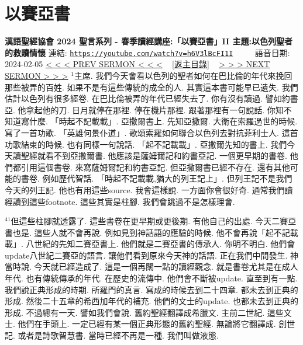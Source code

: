 \documentclass{book}
\begin{document}
\section{以賽亞書}
\label{sec:h6V3lBcFI1I}
\textbf{漢語聖經協會 2024 聖言系列 - 春季讀經講座:「以賽亞書」II 主題:以色列聖者的救贖情懷}
\newline
\newline
連結: \href{https://youtube.com/watch?v=h6V3lBcFI1I}{\texttt{https://youtube.com/watch?v=h6V3lBcFI1I}} ~~~~ 語音日期: 2024-02-05
\newline
\newline
\hyperref[sec:SrQmAQLb4ew]{\small{< < < PREV SERMON < < <}}
~
\hyperref[sec:index]{\small{[返主目錄]}}
~
\hyperref[sec:lB_bfqbs0xw]{\small{> > > NEXT SERMON > > >}}
\newline
\newline
$^{1}$主席.
我們今天會看以色列的聖者如何在巴比倫的年代來挽回那些被弄的百姓.
如果不是有這些傳統的成全的人.
其實這本書可能早已遺失.
我們估計以色列有很多經卷.
在巴比倫被弄的年代已經失去了.
你有沒有讀過.
譬如約書亞.
他拿起他的刀.
日月就停在那裡.
停在機片那裡.
跟著那裡有一句說話.
你知不知道寫什麼.
「時起不記載載」.
亞撒爾書上.
先知亞撒爾.
大衛在索羅過世的時候.
寫了一首功歌.
「英雄何景仆道」.
歌頌索羅如何聯合以色列去對抗菲利士人.
這首功歌結束的時候.
也有同樣一句說話.
「起不記載載」.
亞撒爾先知的書上.
我們今天讀聖經就看不到亞撒爾書.
他應該是薩姆爾記和約書亞記.
一個更早期的書卷.
他們都引用這個書卷.
來寫薩姆爾記和約書亞記.
但亞撒爾書已經不存在.
還有其他可能的書卷.
例如歷代智話.
「時起不記載載,猶大的列王記上」.
但列王記不是我們今天的列王記.
他也有用這些source.
我會這樣說.
一方面你會很好奇.
通常我們讀經讀到這些footnote.
這些其實是柱腳.
我們會跳過不是怎樣理會.

$^{41}$但這些柱腳就透露了.
這些書卷在更早期或更後期.
有他自己的出處.
今天二賽亞書也是.
這些人就不會再說.
例如見到神話語的應驗的時候.
他不會再說「起不記載載」.
八世紀的先知二賽亞書上.
他們就是二賽亞書的傳承人.
你明不明白.
他們會update八世紀二賽亞的語言.
讓他們看到原來今天神的話語.
正在我們中間發生.
神當時說.
今天就已經造成了.
這是一個再闊一點的讀經觀念.
就是書卷尤其是在成人年代.
也有傳統傳承的年代.
在歷史的流傳中.
他們會不斷被update.
直至到有一點.
我們說正典形成的時期.
所羅門的真言.
寫成的時候去到二十四章.
都未去到正典的形成.
然後二十五章的希西加年代的補充.
他們的文士的update.
也都未去到正典的形成.
不過總有一天.
譬如我們會說.
舊約聖經翻譯成希臘文.
主前二世紀.
這些文士.
他們在手頭上.
一定已經有某一個正典形態的舊約聖經.
無論將它翻譯成.
創世記.
或者是詩歌智慧書.
當時已經不再是一種.
我們叫做液態.
\end{document}
